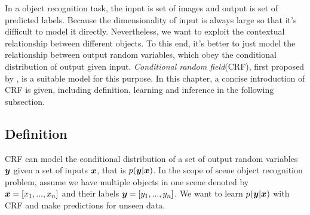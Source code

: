 In a object recognition task, the input is set of images and output is set of predicted labels. Because the dimensionality of input is always large so that it's difficult to model it directly. Nevertheless, we want to exploit the contextual relationship between different objects. To this end, it's better to just model the relationship between output random variables, which obey the conditional distribution of output given input. \textit{Conditional random field}(CRF), first proposed by \cite{lafferty2001conditional}, is a suitable model for this purpose. In this chapter, a concise introduction of CRF is given, including definition, learning and inference in the following subsection.

\subsection{Definition} \label{crf_def}
CRF can model the conditional distribution of a set of output random variables $\boldsymbol y$ given a set of inputs $\boldsymbol x$, that is $p(\boldsymbol y | \boldsymbol x)$. In the scope of scene object recognition problem, assume we have multiple objects in one scene denoted by $\boldsymbol x = [x_1, ..., x_n]$ and their labels $\boldsymbol y = [y_1, ..., y_n]$. We want to learn $p(\boldsymbol y | \boldsymbol x)$ with CRF and make predictions for unseen data.  

